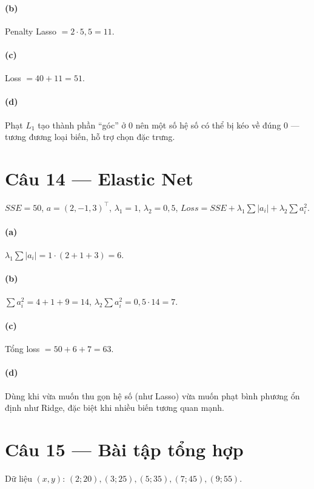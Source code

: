 \paragraph{(b)} Penalty Lasso $=2\cdot 5{,}5=11$.

\paragraph{(c)} Loss $=40+11=51$.

\paragraph{(d)} Phạt $L_1$ tạo thành phần ``góc'' ở $0$ nên một số hệ số có thể bị kéo về đúng $0$ --- tương đương loại biến, hỗ trợ chọn đặc trưng.

\section*{Câu 14 --- Elastic Net}
$SSE=50$, $a=(2,-1,3)^\top$, $\lambda_1=1$, $\lambda_2=0{,}5$, $Loss=SSE+\lambda_1\sum|a_i|+\lambda_2\sum a_i^2$.

\paragraph{(a)} $\lambda_1\sum|a_i|=1\cdot(2+1+3)=6$.

\paragraph{(b)} $\sum a_i^2=4+1+9=14$, $\lambda_2\sum a_i^2=0{,}5\cdot 14=7$.

\paragraph{(c)} Tổng loss $=50+6+7=63$.

\paragraph{(d)} Dùng khi vừa muốn thu gọn hệ số (như Lasso) vừa muốn phạt bình phương ổn định như Ridge, đặc biệt khi nhiều biến tương quan mạnh.

\section*{Câu 15 --- Bài tập tổng hợp}
Dữ liệu $(x,y)$: $(2;20),(3;25),(5;35),(7;45),(9;55)$.


